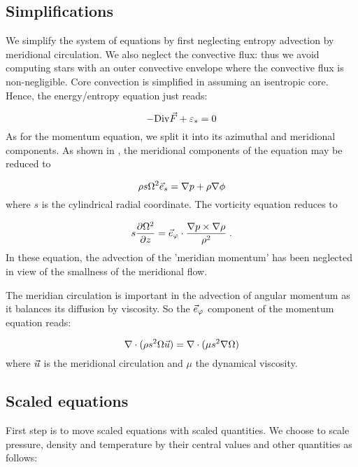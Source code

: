 \subsection{Simplifications}

We simplify the system of equations by first neglecting entropy
advection by meridional circulation. We also neglect the convective
flux: thus we avoid computing stars with an outer convective envelope
where the convective flux is non-negligible. Core convection is
simplified in assuming an isentropic core. Hence, the energy/entropy
equation just reads:

\begin{equation} -\displaystyle {\rm Div}\vec{F} + \varepsilon_* = 0\end{equation}
As for the momentum equation, we split it into its azimuthal and
meridional components. As shown in \cite[][]{ELR13}, the meridional
components of the equation may be reduced to 

\begin{equation}
\rho s\Omega^2\vec{e}_s=\nabla p+\rho\nabla\phi
\label{baroc}
\end{equation}
where $s$ is the cylindrical radial coordinate. The vorticity equation
reduces to

\begin{equation}
\label{eq:vort_inv}
s\frac{\partial\Omega^2}{\partial z}=\vec{e}_\varphi\cdot\frac{\nabla
p\times\nabla\rho}{\rho^2} \;.
\end{equation}
In these equation, the advection of the 'meridian momentum' has been
neglected in view of the smallness of the meridional flow.

The meridian circulation is important in the advection of angular
momentum as it balances its diffusion by viscosity. So the $\vec{e}_\varphi$
component of the momentum equation reads:

\begin{equation}
\label{eq:angular_mom}
\nabla\cdot{(\rho s^2\Omega\vec{u})}=\nabla\cdot (\mu s^2\nabla\Omega)
\end{equation}
where $\vec{u}$ is the meridional circulation and $\mu$ the dynamical
viscosity.


\subsection{Scaled equations}

First step is to move scaled equations with scaled quantities. We choose
to scale pressure, density and temperature by their central values and
other quantities as follows:

